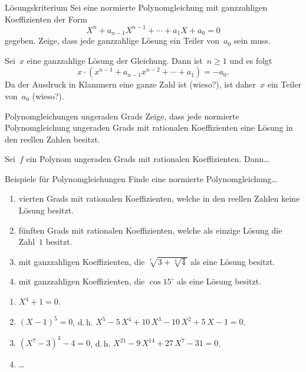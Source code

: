 \documentclass{algblatt}
\begin{document}

\begin{aufgabe}{Lösungskriterium}
Sei eine normierte Polynomgleichung mit ganzzahligen Koeffizienten
der Form
\[ X^n + a_{n-1} X^{n-1} + \cdots + a_1 X + a_0 = 0 \]
gegeben. Zeige, dass
jede ganzzahlige Lösung ein Teiler von~$a_0$ sein muss.
\begin{loesung}Sei~$x$ eine ganzzahlige Lösung der Gleichung. Dann ist~$n \geq
1$ und es folgt
\[ x \cdot (x^{n-1} + a_{n-1} x^{n-2} + \cdots + a_1) = -a_0. \]
Da der Ausdruck in Klammern eine ganze Zahl ist (wieso?), ist daher~$x$ ein
Teiler von~$a_0$ (wieso?).
\end{loesung}
\end{aufgabe}

\begin{aufgabe}{Polynomgleichungen ungeraden Grads}
Zeige, dass jede normierte Polynomgleichung ungeraden Grads mit rationalen
Koeffizienten eine Lösung in den reellen Zahlen besitzt.
\begin{loesung}Sei~$f$ ein Polynom ungeraden Grads mit rationalen
Koeffizienten. Dann\ldots
\end{loesung}
\end{aufgabe}

\begin{aufgabe}{Beispiele für Polynomgleichungen}
Finde eine normierte Polynomgleichung\ldots
\begin{enumerate}
\item vierten Grads mit rationalen
Koeffizienten, welche in den reellen Zahlen keine Lösung besitzt.
\item fünften Grads mit rationalen
Koeffizienten, welche als einzige Lösung die Zahl~$1$ besitzt.
\item mit ganzzahligen Koeffizienten, die
$\sqrt[7]{3 + \sqrt[3]{4}}$ als eine Lösung besitzt.
\item mit ganzzahligen Koeffizienten, die
$\cos 15^\circ$ als eine Lösung besitzt.
\end{enumerate}
\begin{loesung}\begin{enumerate}
\item $X^4 + 1 = 0$.
\item $(X - 1)^5 = 0$, d.\,h. $X^5-5\,X^4+10\,X^3-10\,X^2+5\,X-1 = 0$.
\item $(X^7-3)^3-4=0$, d.\,h. $X^{21}-9\,X^{14}+27\,X^7-31 = 0$.
\item \ldots
\end{enumerate}
\end{loesung}
\end{aufgabe}
\end{document}
